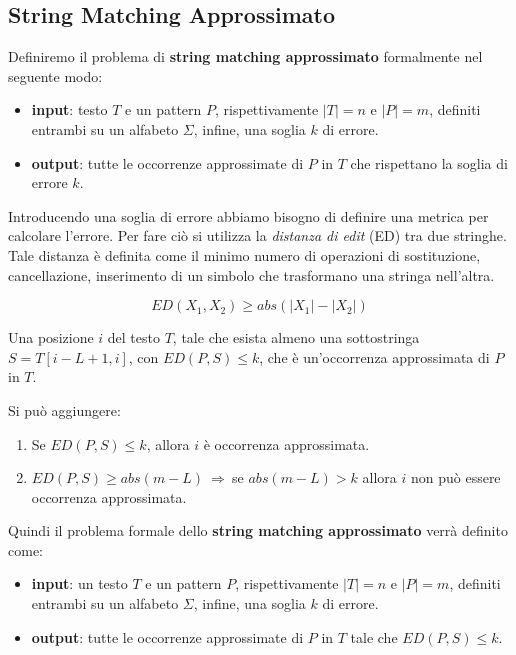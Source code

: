 \subsection{String Matching Approssimato}
Definiremo il problema di \textbf{string matching approssimato} formalmente nel
seguente modo:
\begin{itemize}
    \item \textbf{input}: testo $T$ e un pattern $P$, rispettivamente $|T| = n$ e
          $|P| = m$, definiti entrambi su un alfabeto $\Sigma$, infine, una
          soglia $k$ di errore.
    \item \textbf{output}: tutte le occorrenze approssimate di $P$ in $T$ che
          rispettano la soglia di errore $k$.
\end{itemize}
Introducendo una soglia di errore abbiamo bisogno di definire una metrica per
calcolare l'errore. Per fare ciò si utilizza la \textit{distanza di edit} (ED)
tra due stringhe. Tale distanza è definita come il minimo numero di operazioni di
sostituzione, cancellazione, inserimento di un simbolo che trasformano una
stringa nell'altra.
\begin{nota}
    \begin{equation}
        ED(X_1, X_2) \geq abs(|X_1| - |X_2|)
    \end{equation}
\end{nota}
\begin{definizione}
    Una posizione $i$ del testo $T$, tale che esista almeno una sottostringa
    $S = T[i - L + 1,i]$, con $ED(P, S) \leq k$, che è un'occorrenza approssimata
    di $P$ in $T$.
\end{definizione}
\begin{nota}
    Si può aggiungere:
    \begin{enumerate}
        \item Se $ED(P, S) \leq k$, allora $i$ è occorrenza approssimata.
        \item $ED(P, S) \geq abs(m - L) \ \Rightarrow \ $se $abs(m - L) > k$
              allora $i$ non può essere occorrenza approssimata.
    \end{enumerate}
\end{nota}
Quindi il problema formale dello \textbf{string matching approssimato} verrà
definito come:
\begin{itemize}
    \item \textbf{input}: un testo $T$ e un pattern $P$, rispettivamente $|T| = n$
          e $|P| = m$, definiti entrambi su un alfabeto $\Sigma$, infine, una
          soglia $k$ di errore.
    \item \textbf{output}: tutte le occorrenze approssimate di $P$ in $T$ tale
          che  $ED(P,S)\le k$.
\end{itemize}
